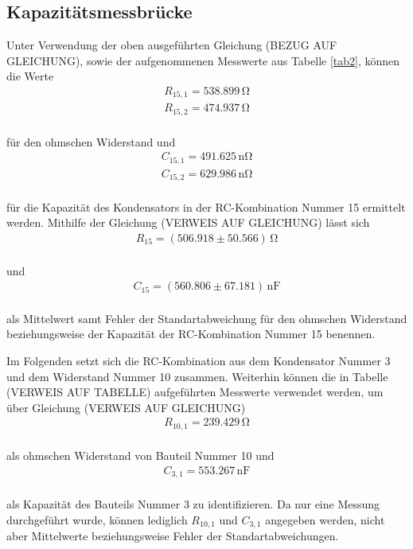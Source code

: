 \subsection{Kapazitätsmessbrücke}

Unter Verwendung der oben ausgeführten Gleichung (BEZUG AUF GLEICHUNG), sowie der aufgenommenen
Messwerte aus Tabelle \ref{tab2}, können die Werte 
\begin{align}
R_{15,1} = 538.899\,\si{\ohm} \nonumber \\
R_{15,2} = 474.937\,\si{\ohm} \nonumber  
\end{align}
\\
für den ohmschen Widerstand und
\begin{align}
C_{15,1} = 491.625\,\si{\nano\ohm} \nonumber \\
C_{15,2} = 629.986\,\si{\nano\ohm} \nonumber 
\end{align}
\\
für die Kapazität des Kondensators in der RC-Kombination Nummer 15 ermittelt werden.
Mithilfe der Gleichung (VERWEIS AUF GLEICHUNG)
lässt sich 
\begin{align}
R_{15} = (506.918 \pm 50.566)\, \si{\ohm} \nonumber 
\end{align}
\\
und
\begin{align}
C_{15} = (560.806 \pm 67.181)\, \si{\nano\farad} \nonumber 
\end{align}
\\
als Mittelwert samt Fehler der Standartabweichung für den ohmschen Widerstand beziehungsweise der
Kapazität der RC-Kombination Nummer 15 benennen.

Im Folgenden setzt sich die RC-Kombination aus dem Kondensator Nummer 3 und dem Widerstand Nummer 10 zusammen. Weiterhin 
können die in Tabelle (VERWEIS AUF TABELLE) aufgeführten Messwerte verwendet werden, um über Gleichung
(VERWEIS AUF GLEICHUNG) 
\begin{align}
R_{10,1} = 239.429\, \si{\ohm} \nonumber
\end{align}
\\
als ohmschen Widerstand von Bauteil Nummer 10 und
\begin{align}
C_{3,1} = 553.267\, \si{\nano\farad} \nonumber
\end{align}
\\
als Kapazität des Bauteils Nummer 3 zu identifizieren. Da nur eine Messung durchgeführt wurde, können lediglich $R_{10,1}$
und $C_{3,1}$ angegeben werden, nicht aber Mittelwerte beziehungsweise Fehler der Standartabweichungen.


